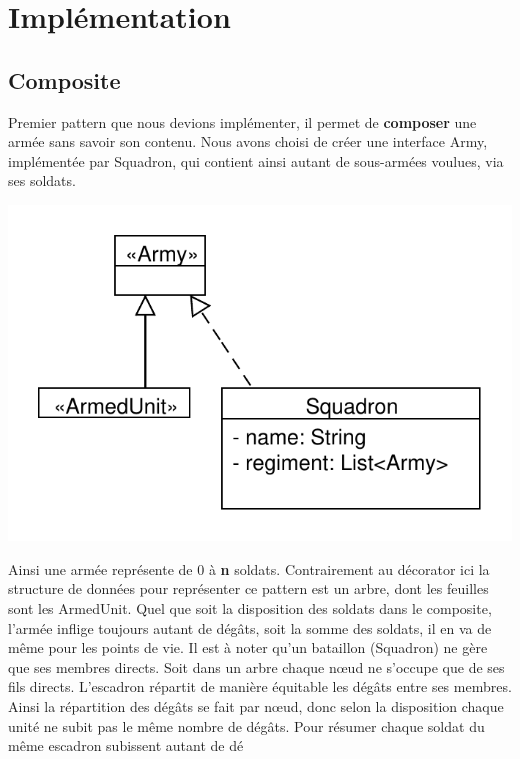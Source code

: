\documentclass[12pt]{article}
\begin{document}
\newpage
\section{Implémentation}
\subsection{Composite}
Premier pattern que nous devions implémenter, il permet de \textbf{composer} une armée sans savoir son contenu.
Nous avons choisi de créer une interface Army, implémentée par Squadron, qui contient ainsi autant de sous-armées voulues, via ses soldats.

\includegraphics[scale=1]{../UML/Composite}

Ainsi une armée représente de 0 à \textbf{n} soldats.
Contrairement au décorator ici la structure de données pour représenter ce pattern
est un arbre, dont les feuilles sont les ArmedUnit.
Quel que soit la disposition des soldats dans le composite, l'armée inflige 
toujours autant de dégâts, soit la somme des soldats, il en va de même pour les 
points de vie.
Il est à noter qu'un bataillon (Squadron) ne gère que ses membres directs.
Soit dans un arbre chaque nœud ne s'occupe que de ses fils directs.
L'escadron répartit de manière équitable les dégâts entre ses membres.
Ainsi la répartition des dégâts se fait par nœud, donc selon la disposition
chaque unité ne subit pas le même nombre de dégâts.
Pour résumer chaque soldat du même escadron subissent autant de dé
\end{document}

